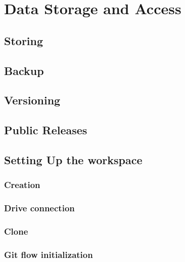 \section{Data Storage and Access}

\subsection{Storing}

\subsection{Backup}

\subsection{Versioning}

\subsection{Public Releases}

\subsection{Setting Up the workspace}

\subsubsection{Creation}

\subsubsection{Drive connection}

\subsubsection{Clone}

\subsubsection{Git flow initialization}
